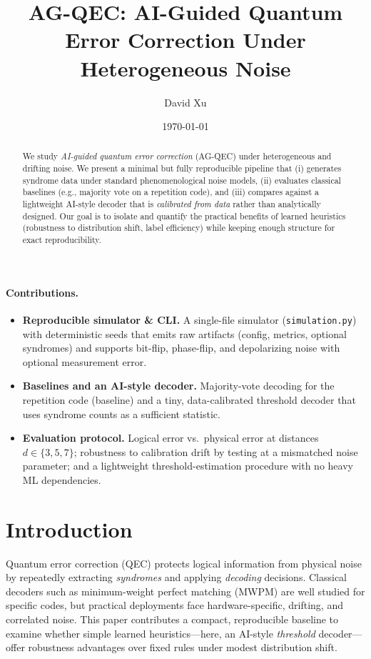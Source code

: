 \documentclass[11pt]{article}
\title{AG-QEC: AI-Guided Quantum Error Correction Under Heterogeneous Noise}
\author{David Xu}
\date{\today}
\begin{document}
\maketitle

\begin{abstract}
We study \emph{AI-guided quantum error correction} (AG-QEC) under heterogeneous and drifting noise.
We present a minimal but fully reproducible pipeline that (i) generates syndrome data under standard phenomenological noise models, (ii) evaluates classical baselines (e.g., majority vote on a repetition code), and (iii) compares against a lightweight AI-style decoder that is \emph{calibrated from data} rather than analytically designed. 
Our goal is to isolate and quantify the practical benefits of learned heuristics (robustness to distribution shift, label efficiency) while keeping enough structure for exact reproducibility.
\end{abstract}

\paragraph{Contributions.}
\begin{itemize}[leftmargin=*]
  \item \textbf{Reproducible simulator \& CLI.} A single-file simulator (\texttt{simulation.py}) with deterministic seeds that emits raw artifacts (config, metrics, optional syndromes) and supports bit-flip, phase-flip, and depolarizing noise with optional measurement error.
  \item \textbf{Baselines and an AI-style decoder.} Majority-vote decoding for the repetition code (baseline) and a tiny, data-calibrated threshold decoder that uses syndrome counts as a sufficient statistic.
  \item \textbf{Evaluation protocol.} Logical error vs.\ physical error at distances $d\in\{3,5,7\}$; robustness to calibration drift by testing at a mismatched noise parameter; and a lightweight threshold-estimation procedure with no heavy ML dependencies.
\end{itemize}

\section{Introduction}
Quantum error correction (QEC) protects logical information from physical noise by repeatedly extracting \emph{syndromes} and applying \emph{decoding} decisions. Classical decoders such as minimum-weight perfect matching (MWPM) are well studied for specific codes, but practical deployments face hardware-specific, drifting, and correlated noise. This paper contributes a compact, reproducible baseline to examine whether simple learned heuristics---here, an AI-style \emph{threshold} decoder---offer robustness advantages over fixed rules under modest distribution shift.
\end{document}
